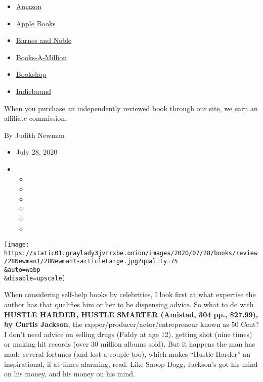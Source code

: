 \begin{itemize}
\tightlist
\item
  \href{https://www.amazon.com/gp/search?index=books\&tag=NYTBSREV-20\&field-keywords=Hustle+Harder\%2C+Hustle+Smarter+Curtis+Jackson}{Amazon}
\item
  \href{https://du-gae-books-dot-nyt-du-prd.appspot.com/buy?title=Hustle+Harder\%2C+Hustle+Smarter\&author=Curtis+Jackson}{Apple
  Books}
\item
  \href{https://www.anrdoezrs.net/click-7990613-11819508?url=https\%3A\%2F\%2Fwww.barnesandnoble.com\%2Fw\%2F\%3Fean\%3D9780062953803}{Barnes
  and Noble}
\item
  \href{https://www.anrdoezrs.net/click-7990613-35140?url=https\%3A\%2F\%2Fwww.booksamillion.com\%2Fp\%2FHustle\%2BHarder\%252C\%2BHustle\%2BSmarter\%2FCurtis\%2BJackson\%2F9780062953803}{Books-A-Million}
\item
  \href{https://bookshop.org/a/3546/9780062953803}{Bookshop}
\item
  \href{https://www.indiebound.org/book/9780062953803?aff=NYT}{Indiebound}
\end{itemize}

When you purchase an independently reviewed book through our site, we
earn an affiliate commission.

By Judith Newman

\begin{itemize}
\item
  July 28, 2020
\item
  \begin{itemize}
  \item
  \item
  \item
  \item
  \item
  \item
  \end{itemize}
\end{itemize}

\texttt{[image: https://static01.graylady3jvrrxbe.onion/images/2020/07/28/books/review/28Newman1/28Newman1-articleLarge.jpg?quality=75\\\&auto=webp\\\&disable=upscale]}

When considering self-help books by celebrities, I look first at what
expertise the author has that qualifies him or her to be dispensing
advice. So what to do with \textbf{HUSTLE HARDER, HUSTLE SMARTER
(Amistad, 304 pp., \$27.99), by Curtis Jackson}, the
rapper/producer/actor/entrepreneur known as 50 Cent? I don't need advice
on selling drugs (Fiddy at age 12), getting shot (nine times) or making
hit records (over 30 million albums sold). But it happens the man has
made several fortunes (and lost a couple too), which makes ``Hustle
Harder'' an inspirational, if at times alarming, read. Like Snoop Dogg,
Jackson's got his mind on his money, and his money on his mind.

